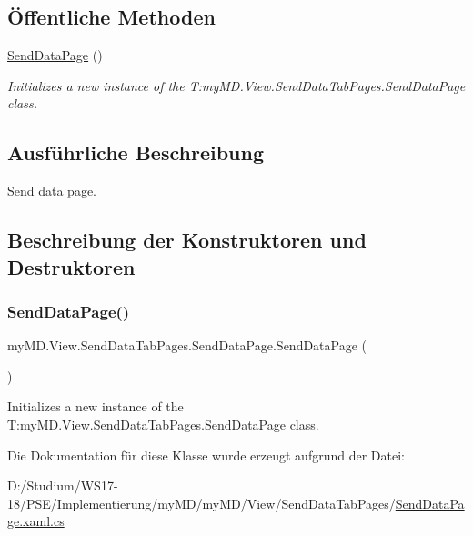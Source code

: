 \subsection*{Öffentliche Methoden}
\begin{DoxyCompactItemize}
\item 
\mbox{\hyperlink{classmy_m_d_1_1_view_1_1_send_data_tab_pages_1_1_send_data_page_a7fbb8405720e4cc1c28ed4315fccde8e}{Send\+Data\+Page}} ()
\begin{DoxyCompactList}\small\item\em Initializes a new instance of the T\+:my\+M\+D.\+View.\+Send\+Data\+Tab\+Pages.\+Send\+Data\+Page class. \end{DoxyCompactList}\end{DoxyCompactItemize}


\subsection{Ausführliche Beschreibung}
Send data page. 



\subsection{Beschreibung der Konstruktoren und Destruktoren}
\mbox{\label{classmy_m_d_1_1_view_1_1_send_data_tab_pages_1_1_send_data_page_a7fbb8405720e4cc1c28ed4315fccde8e}} 
\subsubsection{\texorpdfstring{Send\+Data\+Page()}{SendDataPage()}}
{\footnotesize\ttfamily my\+M\+D.\+View.\+Send\+Data\+Tab\+Pages.\+Send\+Data\+Page.\+Send\+Data\+Page (\begin{DoxyParamCaption}{ }\end{DoxyParamCaption})}



Initializes a new instance of the T\+:my\+M\+D.\+View.\+Send\+Data\+Tab\+Pages.\+Send\+Data\+Page class. 



Die Dokumentation für diese Klasse wurde erzeugt aufgrund der Datei\+:\begin{DoxyCompactItemize}
\item 
D\+:/\+Studium/\+W\+S17-\/18/\+P\+S\+E/\+Implementierung/my\+M\+D/my\+M\+D/\+View/\+Send\+Data\+Tab\+Pages/\mbox{\hyperlink{_send_data_page_8xaml_8cs}{Send\+Data\+Page.\+xaml.\+cs}}\end{DoxyCompactItemize}
